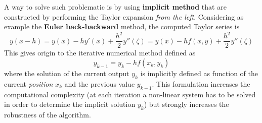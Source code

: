 		A way to solve such problematic is by using \textbf{implicit method} that are constructed by performing the Taylor expansion \textit{from the left}. Considering as example the \textbf{Euler back-backward} method, the computed Taylor series is
		\[ y(x-h) = y(x) - h y'(x) + \frac{h^2}{2} y''(\zeta) = y(x) - h f(x,y) + \frac{h^2}{2} y''(\zeta) \] 
		This gives origin to the iterative numerical method defined as
		\begin{equation} \label{eq:ode:impliciteuler}
			y_{k-1} = y_k - h f(x_k,y_k)
		\end{equation} 
		where the solution of the current output $y_k$ is implicitly defined as function of the current \textit{position} $x_k$ and the previous value $y_{k-1}$. This formulation increases the computational complexity (at each iteration a non-linear system has to be solved in order to determine the implicit solution $y_k$) but strongly increases the robustness of the algorithm.
	
